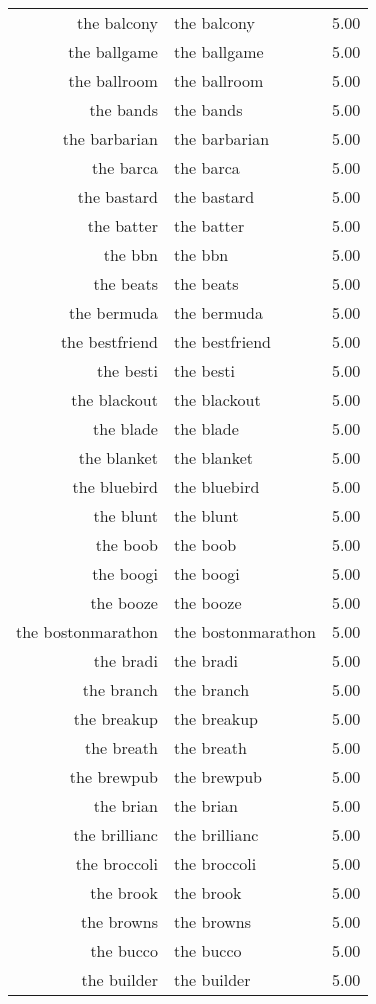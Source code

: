 \begin{table}[ht]
\begin{tabular}{rlr}
  the balcony & the balcony & 5.00 \\ 
  the ballgame & the ballgame & 5.00 \\ 
  the ballroom & the ballroom & 5.00 \\ 
  the bands & the bands & 5.00 \\ 
  the barbarian & the barbarian & 5.00 \\ 
  the barca & the barca & 5.00 \\ 
  the bastard & the bastard & 5.00 \\ 
  the batter & the batter & 5.00 \\ 
  the bbn & the bbn & 5.00 \\ 
  the beats & the beats & 5.00 \\ 
  the bermuda & the bermuda & 5.00 \\ 
  the bestfriend & the bestfriend & 5.00 \\ 
  the besti & the besti & 5.00 \\ 
  the blackout & the blackout & 5.00 \\ 
  the blade & the blade & 5.00 \\ 
  the blanket & the blanket & 5.00 \\ 
  the bluebird & the bluebird & 5.00 \\ 
  the blunt & the blunt & 5.00 \\ 
  the boob & the boob & 5.00 \\ 
  the boogi & the boogi & 5.00 \\ 
  the booze & the booze & 5.00 \\ 
  the bostonmarathon & the bostonmarathon & 5.00 \\ 
  the bradi & the bradi & 5.00 \\ 
  the branch & the branch & 5.00 \\ 
  the breakup & the breakup & 5.00 \\ 
  the breath & the breath & 5.00 \\ 
  the brewpub & the brewpub & 5.00 \\ 
  the brian & the brian & 5.00 \\ 
  the brillianc & the brillianc & 5.00 \\ 
  the broccoli & the broccoli & 5.00 \\ 
  the brook & the brook & 5.00 \\ 
  the browns & the browns & 5.00 \\ 
  the bucco & the bucco & 5.00 \\ 
  the builder & the builder & 5.00 \\ 

\end{tabular}
\end{table}
